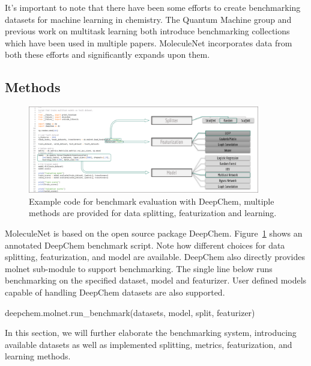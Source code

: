 It's important to note that there have been some efforts to create benchmarking datasets for machine learning in chemistry. The Quantum Machine group \cite{QuantumMachine} and previous work on multitask learning \cite{ramsundar2015massively} both introduce benchmarking collections which have been used in multiple papers. MoleculeNet incorporates data from both these efforts and significantly expands upon them.

\subsection{Methods}

\begin{figure}
  \centering
  \includegraphics[width=0.9\textwidth]{Images/benchmark_framework.png}
  \caption{Example code for benchmark evaluation with DeepChem, multiple methods are provided for data splitting, featurization and learning.}
  \label{fig:benchmark_example}
\end{figure}

MoleculeNet is based on the open source package DeepChem\cite{deepchem}. Figure~\ref{fig:benchmark_example} shows an annotated DeepChem benchmark script. Note how different choices for data splitting, featurization, and model are available. DeepChem also directly provides molnet sub-module to support benchmarking. The single line below runs benchmarking on the specified dataset, model and featurizer. User defined models capable of handling DeepChem datasets are also supported.

{\selectfont
deepchem.molnet.run\_benchmark(datasets, model, split, featurizer)
}

In this section, we will further elaborate the benchmarking system, introducing available datasets as well as implemented splitting, metrics, featurization, and learning methods.


